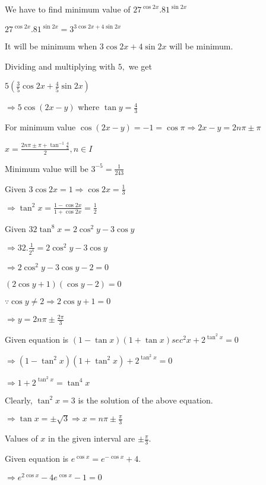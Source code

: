 \item We have to find minimum value of $27^{\cos2x}.81^{\sin2x}$

  $27^{\cos2x}.81^{\sin2x} = 3^{3\cos2x + 4\sin2x}$

  It will be minimum when $3\cos2x + 4\sin2x$ will be minimum.

  Dividing and multiplying with $5,$ we get

  $5\left(\frac{3}{5}\cos2x + \frac{4}{5}\sin2x\right)$

  $\Rightarrow 5\cos(2x - y)$ where $\tan y = \frac{4}{3}$

  For minimum value $\cos(2x - y) = -1 = \cos\pi \Rightarrow 2x - y = 2n\pi\pm\pi$

  $x = \frac{2n\pi\pm\pi + \tan^{-1}\frac{4}{3}}{2}, n \in I$

  Minimum value will be $3^{-5} = \frac{1}{243}$

\item Given $3\cos 2x = 1 \Rightarrow \cos2x = \frac{1}{3}$

  $\Rightarrow \tan^2x = \frac{1 - \cos2x}{1 + \cos2x} = \frac{1}{2}$

  Given $32\tan^8x = 2\cos^2y - 3\cos y$

  $\Rightarrow 32.\frac{1}{2^4} = 2\cos^2y - 3\cos y$

  $\Rightarrow 2\cos^2y - 3\cos y - 2 = 0$

  $(2\cos y + 1)(\cos y - 2) = 0$

  $\because \cos y \neq 2 \Rightarrow 2\cos y + 1 = 0$

  $\Rightarrow y = 2n\pi\pm\frac{2\pi}{3}$

\item Given equation is $(1 - \tan x)(1 + \tan x)sec^2x + 2^{\tan^2x} = 0$

  $\Rightarrow (1 - \tan^2x)(1 + \tan^2x) + 2^{\tan^2x} = 0$

  $\Rightarrow 1 + 2^{\tan^2x} = \tan^4x$

  Clearly, $\tan^2x = 3$ is the solution of the above equation.

  $\Rightarrow \tan x = \pm\sqrt{3} \Rightarrow x = n\pi\pm\frac{\pi}{3}$

  Values of $x$ in the given interval are $\pm\frac{\pi}{3}.$

\item Given equation is $e^{\cos x} = e^{-\cos x} + 4.$

  $\Rightarrow e^{2\cos x} - 4e^{\cos x} - 1= 0$

